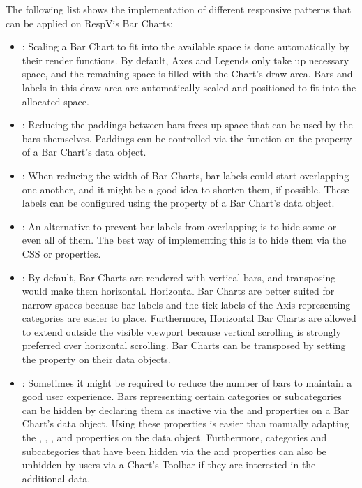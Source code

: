 The following list shows the implementation of different responsive
patterns that can be applied on RespVis Bar Charts:
\begin{itemize}
\item {}: Scaling a Bar Chart to fit into the
  available space is done automatically by their render functions.  By
  default, Axes and Legends only take up necessary space, and the
  remaining space is filled with the Chart's draw area.  Bars and
  labels in this draw area are automatically scaled and positioned to
  fit into the allocated space.

\item {}: Reducing the paddings between bars
  frees up space that can be used by the bars themselves.  Paddings
  can be controlled via the  function on the
   property of a Bar Chart's data object.

\item {}: When reducing the width of Bar
  Charts, bar labels could start overlapping one another, and it might
  be a good idea to shorten them, if possible.  These labels can be
  configured using the  property of a Bar Chart's data
  object.

\item {}: An alternative to prevent bar
  labels from overlapping is to hide some or even all of them.  The
  best way of implementing this is to hide them via the CSS
   or  properties.

\item {}: By default, Bar Charts are rendered
  with vertical bars, and transposing would make them horizontal.
  Horizontal Bar Charts are better suited for narrow spaces because
  bar labels and the tick labels of the Axis representing categories
  are easier to place.  Furthermore, Horizontal Bar Charts are allowed
  to extend outside the visible viewport because vertical scrolling is
  strongly preferred over horizontal scrolling.  Bar Charts can be
  transposed by setting the  property on their data
  objects.

\item {}: Sometimes it might be required to reduce
  the number of bars to maintain a good user experience.  Bars
  representing certain categories or subcategories can be hidden by
  declaring them as inactive via the  and
   properties on a Bar Chart's data object.
  Using these properties is easier than manually adapting the
  , , , and
   properties on the data object. Furthermore,
  categories and subcategories that have been hidden via the
   and  properties
  can also be unhidden by users via a Chart's Toolbar if they are
  interested in the additional data.


\end{itemize}
